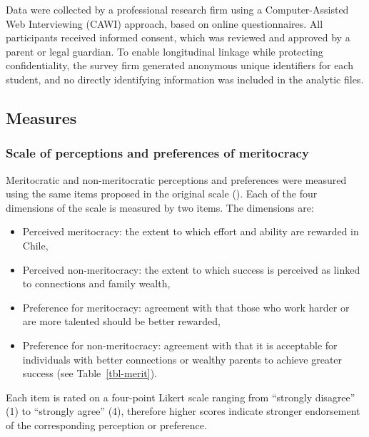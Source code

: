 \documentclass[
  13pt,
]{article}
\begin{document}
Data were collected by a professional research firm using a
Computer-Assisted Web Interviewing (CAWI) approach, based on online
questionnaires. All participants received informed consent, which was
reviewed and approved by a parent or legal guardian. To enable
longitudinal linkage while protecting confidentiality, the survey firm
generated anonymous unique identifiers for each student, and no directly
identifying information was included in the analytic files.

\subsection{Measures}\label{measures}

\subsubsection{Scale of perceptions and preferences of
meritocracy}\label{scale-of-perceptions-and-preferences-of-meritocracy}

Meritocratic and non-meritocratic perceptions and preferences were
measured using the same items proposed in the original scale
().
Each of the four dimensions of the scale is measured by two items. The
dimensions are:

\begin{itemize}
\item
  Perceived meritocracy: the extent to which effort and ability are
  rewarded in Chile,
\item
  Perceived non-meritocracy: the extent to which success is perceived as
  linked to connections and family wealth,
\item
  Preference for meritocracy: agreement with that those who work harder
  or are more talented should be better rewarded,
\item
  Preference for non-meritocracy: agreement with that it is acceptable
  for individuals with better connections or wealthy parents to achieve
  greater success (see Table~\ref{tbl-merit}).
\end{itemize}

Each item is rated on a four-point Likert scale ranging from ``strongly
disagree'' (1) to ``strongly agree'' (4), therefore higher scores
indicate stronger endorsement of the corresponding perception or
preference.
\end{document}
